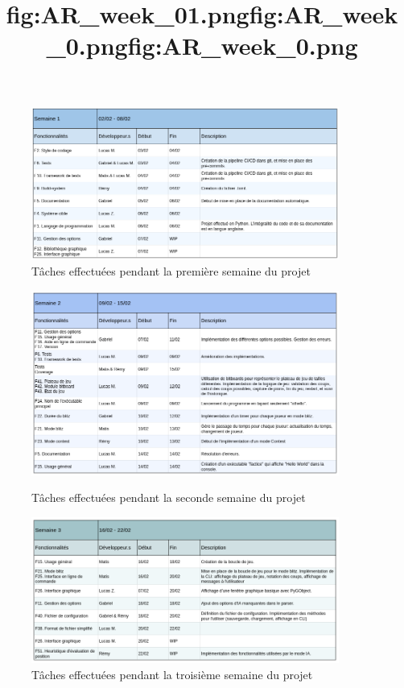 \documentclass[a4paper,12pt]{article}
\begin{document}
\begin{figure}[h]

    \vspace{3cm}

    \centering
    \includegraphics[width=0.9\textwidth]{images/AR_week_01.png}
    \caption{Tâches effectuées pendant la première semaine du projet}
    \title{fig:AR_week_01.png}

    \vspace{1cm}

\end{figure}

\begin{figure}[h]
    \centering
    \includegraphics[width=0.9\textwidth]{images/AR_week_02.png}
    \caption{Tâches effectuées pendant la seconde semaine du projet}
    \title{fig:AR_week_0.png}

    \vspace{1cm}

    \includegraphics[width=0.9\textwidth]{images/AR_week_03.png}
    \caption{Tâches effectuées pendant la troisième semaine du projet}
    \title{fig:AR_week_0.png}
\end{figure}
\end{document}
